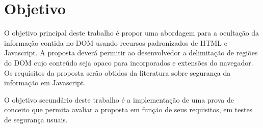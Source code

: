 \section{Objetivo}
O objetivo principal deste trabalho é propor uma abordagem para a ocultação da informação contida no DOM usando recursos padronizados de HTML e Javascript. A proposta deverá permitir ao desenvolvedor a delimitação de regiões do DOM cujo conteúdo seja opaco para {\scripts} incorporados e extensões do navegador. Os requisitos da proposta serão obtidos da literatura sobre segurança da informação em Javascript.

O objetivo secundário deste trabalho é a implementação de uma prova de conceito que permita avaliar a proposta em função de seus requisitos, em testes de segurança usuais.